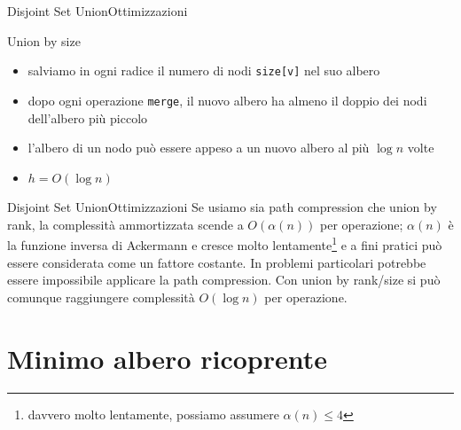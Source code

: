 \documentclass[compress]{beamer}
\begin{document}
\begin{frame}{Disjoint Set Union}{Ottimizzazioni}
    \begin{block}{Union by size}
        \begin{itemize}
            \item salviamo in ogni radice il numero di nodi \texttt{size[v]} nel suo albero
            \item dopo ogni operazione \texttt{merge}, il nuovo albero ha almeno il doppio dei nodi dell'albero pi\`u piccolo
            \item l'albero di un nodo pu\`o essere appeso a un nuovo albero al pi\`u $\log n$ volte
            \item $h = O(\log n)$
        \end{itemize}
    \end{block}
\end{frame}

\begin{frame}{Disjoint Set Union}{Ottimizzazioni}
    Se usiamo sia path compression che union by rank, la complessit\`a ammortizzata scende a $O(\alpha(n))$ per operazione; $\alpha(n)$ \`e la funzione inversa di Ackermann e cresce molto lentamente\footnote{davvero molto lentamente, possiamo assumere $\alpha(n) \leq 4$} e a fini pratici pu\`o essere considerata come un fattore costante.
    \pause
    \vfill
    In problemi particolari potrebbe essere impossibile applicare la path compression. Con union by rank/size si pu\`o comunque raggiungere complessit\`a $O(\log n)$ per operazione.
\end{frame}

\section{Minimo albero ricoprente}
\end{document}
